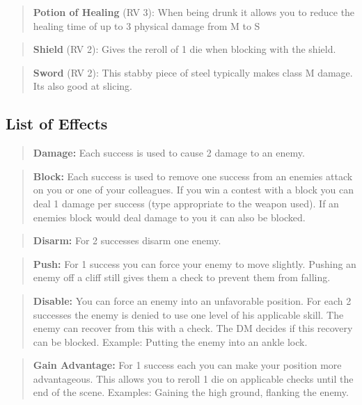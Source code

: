 \documentclass[11pt]{article}
\begin{document}
{\begin{multicols}{2}[]
\begin{quote}
\textbf{Potion of Healing} (RV 3): When being drunk it allows you to reduce the healing time of up to 3 physical damage from M to S
\end{quote}

\begin{quote}
\textbf{Shield} (RV 2): Gives the reroll of 1 die when blocking with the shield.
\end{quote}

\begin{quote}
\textbf{Sword} (RV 2): This stabby piece of steel typically makes class M damage. Its also good at slicing.
\end{quote}

\subsection{List of Effects}
\label{sec:org84288c7}
\begin{quote}
\textbf{Damage:} Each success is used to cause 2 damage to an enemy.
\end{quote}

\begin{quote}
\textbf{Block:} Each success is used to remove one success from an enemies attack on you or one of your colleagues. If you win a contest with a block you can deal 1 damage per success (type appropriate to the weapon used). If an enemies block would deal damage to you it can also be blocked.
\end{quote}

\begin{quote}
\textbf{Disarm:} For 2 successes disarm one enemy.
\end{quote}

\begin{quote}
\textbf{Push:} For 1 success you can force your enemy to move slightly. Pushing an enemy off a cliff still gives them a check to prevent them from falling.
\end{quote}

\begin{quote}
\textbf{Disable:} You can force an enemy into an unfavorable position. For each 2 successes the enemy is denied to use one level of his applicable skill. The enemy can recover from this with a check. The DM decides if this recovery can be blocked. Example: Putting the enemy into an ankle lock.
\end{quote}

\begin{quote}
\textbf{Gain Advantage:} For 1 success each you can make your position more advantageous. This allows you to reroll 1 die on applicable checks until the end of the scene. Examples: Gaining the high ground, flanking the enemy.
\end{quote}


\end{multicols}}
\end{document}
